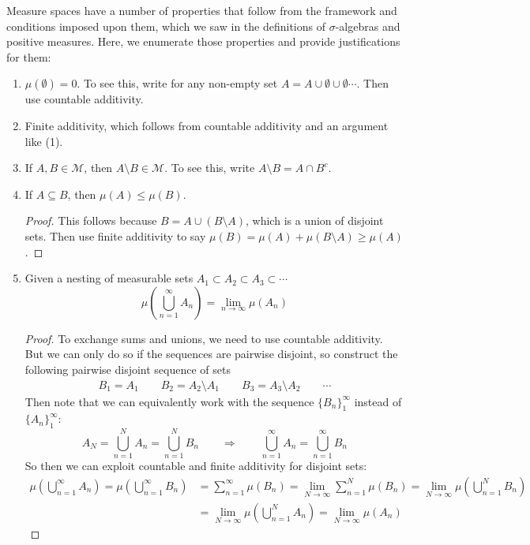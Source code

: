 \documentclass[12pt]{article}
\theoremstyle{plain}
\theoremstyle{definition}
\theoremstyle{remark}
\begin{document}
Measure spaces have a number of properties that follow from the framework and conditions imposed upon them, which we saw in the definitions of $\sigma$-algebras and positive measures. Here, we enumerate those properties and provide justifications for them:
\begin{enumerate}

\item $\mu(\emptyset)=0$. To see this, write for any non-empty set $A=A\cup\emptyset\cup\emptyset\cdots$. Then use countable additivity.

\item Finite additivity, which follows from countable additivity and an argument like (1).

\item If $A,B\in \mathscr{M}$, then $A\setminus B \in \mathscr{M}$. To see this, write $A\setminus B = A \cap B^c$.

\item If $A \subseteq B$, then $\mu(A) \leq \mu(B)$. 
\begin{proof}
This follows because $B = A \cup (B\setminus A)$, which is a union of disjoint sets. Then use finite additivity to say $\mu(B) = \mu(A) + \mu(B\setminus A) \geq \mu(A)$.
\end{proof}

\item Given a nesting of measurable sets $A_1\subset A_2\subset A_3 \subset \cdots$
\[
    \mu\left(\bigcup^\infty_{n=1} A_n\right) = 
    \lim_{n\rightarrow\infty} \mu(A_n)
\]
\begin{proof}
To exchange sums and unions, we need to use countable additivity. But we can only do so if the sequences are pairwise disjoint, so construct the following pairwise disjoint sequence of sets 
\begin{align*}
    B_1 = A_1 \qquad B_2 = A_2 \setminus A_1
    \qquad B_3 = A_3 \setminus A_2 \qquad \cdots
\end{align*}
Then note that we can equivalently work with the sequence $\{B_n\}_1^\infty$ instead of $\{A_n\}_1^\infty$:
\[ 
    A_N = \bigcup^N_{n=1} A_n =
    \bigcup^N_{n=1} B_n 
    \qquad \Rightarrow \qquad
    \bigcup^\infty_{n=1} A_n =
    \bigcup^\infty_{n=1} B_n 
\]
So then we can exploit countable and finite additivity for disjoint sets:
\begin{align*}
    \mu\left(\bigcup^\infty_{n=1} A_n \right)
    = \mu\left(\bigcup^\infty_{n=1} B_n \right)
    &= \sum^\infty_{n=1} \mu(B_n)
        = \lim_{N\rightarrow\infty}\sum^N_{n=1} \mu(B_n) 
    = \lim_{N\rightarrow\infty}
        \mu\left(\bigcup^N_{n=1} B_n\right) \\
    &= \lim_{N\rightarrow\infty}
        \mu\left(\bigcup^N_{n=1} A_n\right) 
    = \lim_{N\rightarrow\infty}
        \mu\left(A_n\right)  
\end{align*}
\end{proof}



\end{enumerate}
\end{document}
